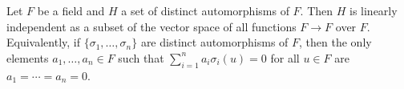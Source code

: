 Let $F$ be a field and $H$ a set of distinct automorphisms of $F$. Then $H$ is linearly independent as a subset of the vector space of all functions $F \to F$ over $F$. Equivalently, if $\{\sigma_1, \ldots, \sigma_n\}$ are distinct automorphisms of $F$, then the only elements $a_1, \ldots, a_n \in F$ such that $\sum_{i=1}^n a_i \sigma_i(u) = 0$ for all $u \in F$ are $a_1 = \cdots = a_n = 0$.

